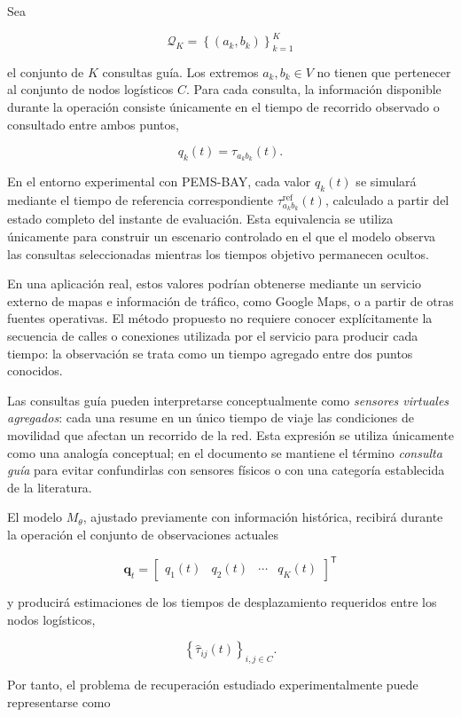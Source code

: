 \documentclass[11pt]{article}
\begin{document}
Sea

\[
\mathcal{Q}_K=
\left\{
(a_k,b_k)
\right\}_{k=1}^{K}
\]

el conjunto de \(K\) consultas guía. Los extremos \(a_k,b_k\in V\) no tienen
que pertenecer al conjunto de nodos logísticos \(C\). Para cada consulta, la
información disponible durante la operación consiste únicamente en el tiempo
de recorrido observado o consultado entre ambos puntos,

\[
q_k(t)=\tau_{a_kb_k}(t).
\]

En el entorno experimental con PEMS-BAY, cada valor \(q_k(t)\) se simulará
mediante el tiempo de referencia correspondiente
\(\tau_{a_kb_k}^{\mathrm{ref}}(t)\), calculado a partir del estado completo del
instante de evaluación. Esta equivalencia se utiliza únicamente para construir
un escenario controlado en el que el modelo observa las consultas seleccionadas
mientras los tiempos objetivo permanecen ocultos.

En una aplicación real, estos valores podrían obtenerse mediante un servicio
externo de mapas e información de tráfico, como Google Maps, o a partir de
otras fuentes operativas. El método propuesto no requiere conocer
explícitamente la secuencia de calles o conexiones utilizada por el servicio
para producir cada tiempo: la observación se trata como un tiempo agregado
entre dos puntos conocidos.

Las consultas guía pueden interpretarse conceptualmente como \textit{sensores
virtuales agregados}: cada una resume en un único tiempo de viaje las
condiciones de movilidad que afectan un recorrido de la red. Esta expresión se
utiliza únicamente como una analogía conceptual; en el documento se mantiene
el término \textit{consulta guía} para evitar confundirlas con sensores físicos
o con una categoría establecida de la literatura.

El modelo \(M_{\theta}\), ajustado previamente con información histórica,
recibirá durante la operación el conjunto de observaciones actuales

\[
\mathbf{q}_t=
\begin{bmatrix}
q_1(t) & q_2(t) & \cdots & q_K(t)
\end{bmatrix}^{\mathsf T}
\]

y producirá estimaciones de los tiempos de desplazamiento requeridos entre los
nodos logísticos,

\[
\left\{
\widehat{\tau}_{ij}(t)
\right\}_{i,j\in C}.
\]

Por tanto, el problema de recuperación estudiado experimentalmente puede
representarse como
\end{document}

